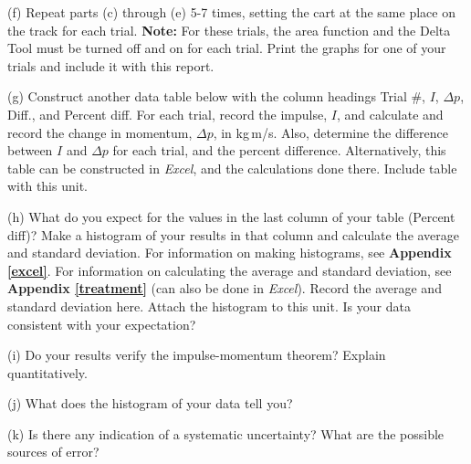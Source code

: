 (f) Repeat parts (c) through (e) 5-7 times, setting the cart at the same place on the track for each trial. \textbf{Note:} For these trials, the area function and the Delta Tool must be turned off and on for each trial. Print the graphs for one of your trials and include it with this report.

(g) Construct another data table below with the column headings
Trial \#, $I$, \( \Delta  p\), Diff., and Percent diff. For each trial, record
the impulse, $I$, and calculate and record the change in momentum, \( \Delta  p\), in kg\,m/s. Also, determine the difference between $I$ and $\Delta p$  for 
each trial, and the percent difference. Alternatively, this table can be constructed in \textit{Excel}, and the calculations done there. Include table with this unit.
\vspace{60mm}

(h) What do you expect for the values in the last column of your table (Percent diff)? Make a histogram of your results in that column and calculate the average and standard deviation. For information on making histograms, see \textbf{Appendix \ref{excel}}. For information on calculating the average and standard deviation, see \textbf{Appendix \ref{treatment}} (can also be done in \textit{Excel}). Record the average and standard 
deviation here. Attach the histogram to this unit. Is your data consistent with your expectation?
\vspace{15mm}

(i) Do your results verify the impulse-momentum theorem? Explain quantitatively.
\vspace{15mm}

(j) What does the histogram of your data tell you?
\vspace{15mm}

(k) Is there any indication of a systematic uncertainty? What are the possible
sources of error?

